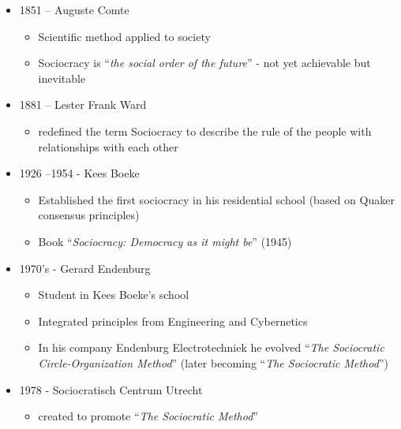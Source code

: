 \begin{itemize}
\item 1851 – Auguste Comte

\begin{itemize}
\item Scientific method applied to society

\item Sociocracy is “\emph{the social order of the future}” - not yet achievable but inevitable

\end{itemize}

\item 1881 – Lester Frank Ward

\begin{itemize}
\item redefined the term Sociocracy to describe the rule of the people with relationships with each other

\end{itemize}

\item 1926 --1954 - Kees Boeke

\begin{itemize}
\item Established the first sociocracy in his residential school (based on Quaker consensus principles)

\item Book “\emph{Sociocracy: Democracy as it might be}” (1945)

\end{itemize}

\item 1970's - Gerard Endenburg

\begin{itemize}
\item Student in Kees Boeke’s school

\item Integrated principles from Engineering and Cybernetics

\item In his company Endenburg Electrotechniek he evolved “\emph{The Sociocratic Circle-Organization Method}” (later becoming ``\emph{The Sociocratic Method}'')

\end{itemize}

\item 1978 - Sociocratisch Centrum Utrecht

\begin{itemize}
\item created to promote ``\emph{The Sociocratic Method}''


\end{itemize}
\end{itemize}

